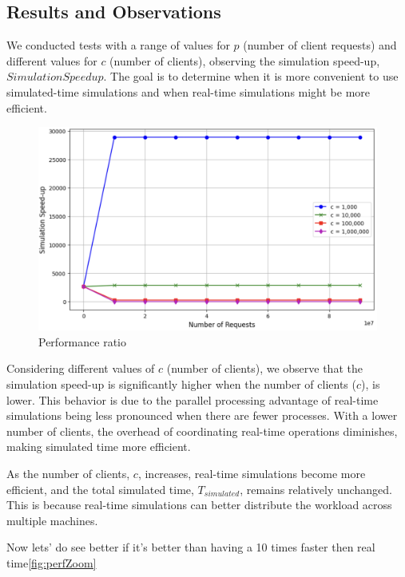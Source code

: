 \subsection{Results and Observations}

We conducted tests with a range of values for \( p \) (number of client requests) and different values for \( c \) (number of clients), observing the simulation speed-up, \( SimulationSpeedup \). The goal is to determine when it is more convenient to use simulated-time simulations and when real-time simulations might be more efficient.

\begin{figure}[H]
    \centering
    \includegraphics[width=\textwidth]{images/speed-up_result.png}
    \caption{Performance ratio}
    \label{fig:performance_ratio}
\end{figure}

Considering different values of \( c \) (number of clients), we observe that the simulation speed-up is significantly higher when the number of clients (\( c \)), is lower. This behavior is due to the parallel processing advantage of real-time simulations being less pronounced when there are fewer processes. With a lower number of clients, the overhead of coordinating real-time operations diminishes, making simulated time more efficient.

As the number of clients, \( c \), increases, real-time simulations become more efficient, and the total simulated time, \( T_{simulated} \), remains relatively unchanged. This is because real-time simulations can better distribute the workload across multiple machines.

Now lets' do see better if it's better than having a 10 times faster then real time\ref{fig:perfZoom}

